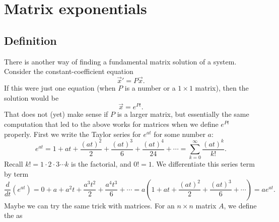 
\sectionnewpage
\section{Matrix exponentials} \label{sec:matexp}



\subsection{Definition}

There is another way of finding a fundamental
matrix solution of a system.
Consider the constant-coefficient equation
\begin{equation*}
{\vec{x}}' = P \vec{x} .
\end{equation*}
If this were just one equation (when $P$ is a number or a $1
\times 1$ matrix), then the solution would be
\begin{equation*}
\vec{x} = e^{Pt} .
\end{equation*}
That does not (yet) make sense if $P$ is a larger matrix, but
essentially the same computation that led to the above
works for matrices when we define
$e^{Pt}$ properly.  First we write the Taylor series for $e^{at}$
for some number $a$:
\begin{equation*}
e^{at} = 1 + at
+ \frac{{(at)}^2}{2}
+ \frac{{(at)}^3}{6}
+ \frac{{(at)}^4}{24}
+ \cdots
= \sum_{k=0}^\infty \frac{{(at)}^k}{k!} .
\end{equation*}
Recall $k! = 1 \cdot 2 \cdot 3 \cdots k$ is the factorial, and $0! = 1$.
We differentiate this series term by term
\begin{equation*}
\frac{d}{dt} \left(e^{at} \right)
= 
0
+ a
+ a^2 t
+ \frac{a^3t^2}{2}
+ \frac{a^4t^3}{6}
+ \cdots
=
a \left(
1
+ a t
+ \frac{{(at)}^2}{2}
+ \frac{{(at)}^3}{6}
+ \cdots \right)
= a e^{at}.
\end{equation*}
Maybe we can try the same trick with matrices.  For an $n \times n$
matrix $A$, we define the
\emph{} as
